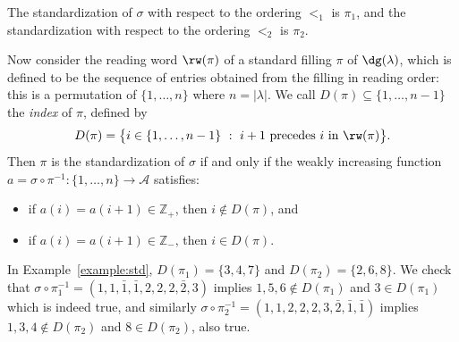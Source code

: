 \begin{example}\label{example:std}
The standardization of $\sigma$ with respect to the ordering $<_1$ is $\pi_1$, and the standardization with respect to the ordering $<_2$ is $\pi_2$.
\begin{center}
\end{center}
\end{example}

Now consider the reading word $\rw(\pi)$ of a standard filling $\pi$ of $\dg(\lambda)$, which is defined to be the sequence of entries obtained from the filling in reading order: this is a permutation of $\{1,\ldots,n\}$ where $n=|\lambda|$. We call $D(\pi)\subseteq\{1,\ldots,n-1\}$ the \emph{index} of $\pi$, defined by
\[
D(\pi)=\big\{i \in \{1,\ldots,n-1\}\ :\ i+1 \text{ precedes } i \text{ in } \rw(\pi)\big\}.
\]
Then $\pi$ is the standardization of $\sigma$ if and only if the weakly increasing function $a=\sigma\circ \pi^{-1}:\{1,\ldots,n\}\rightarrow \mathcal{A}$ satisfies:
\begin{itemize}
\item if $a(i)=a(i+1)\in\mathbb{Z}_+$, then $i\not\in D(\pi)$, and
\item if $a(i)=a(i+1)\in\mathbb{Z}_-$, then $i\in D(\pi)$.
\end{itemize} 
\begin{example}
In Example~\ref{example:std}, $D(\pi_1)=\{3,4,7\}$ and $D(\pi_2)=\{2,6,8\}$. We check that $\sigma\circ\pi_1^{-1}=(1,1,\bar{1},\bar{1},2,2,2,\bar{2},3)$ implies $1,5,6 \not\in D(\pi_1)$ and $3\in D(\pi_1)$ which is indeed true, and similarly $\sigma\circ\pi_2^{-1}=(1,1,2,2,2,3,\bar{2},\bar{1},\bar{1})$ implies $1,3,4\not\in D(\pi_2)$ and $8\in D(\pi_2)$, also true. 
\end{example}

